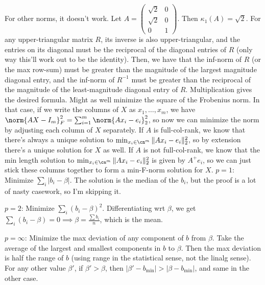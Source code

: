 \documentclass{article}
\newcommand{\openm}{\begin{pmatrix}}
\newcommand{\closem}{\end{pmatrix}}
\begin{document}
For other norms, it doesn't work. Let $A=\openm\sqrt{2}&0\\\sqrt{2}&0\\0&1\closem$. Then $\kappa_1(A)=\sqrt{2}$.
For any upper-triangular matrix $R$, its inverse is also upper-triangular, and the entries on its diagonal must be the reciprocal of the diagonal entries of $R$ (only way this'll work out to be the identity). Then, we have that the inf-norm of $R$ (or the max row-sum) must be greater than the magnitude of the largest magnitude diagonal entry, and the inf-norm of $R^{-1}$ must be greater than the reciprocal of the magnitude of the least-magnitude diagonal entry of $R$. Multiplication gives the desired formula.
Might as well minimize the square of the Frobenius norm. In that case, if we write the columns of $X$ as $x_1,\ldots,x_m$, we have $\norm{AX-I_m}_F^2=\sum_{i=1}^m\norm{Ax_i-e_i}_2^2$, so now we can minimize the norm by adjusting each column of $X$ separately. If $A$ is full-col-rank, we know that there's always a unique solution to $\min_{x_i\in\cn^m}\|Ax_i-e_i\|_2^2$, so by extension there's a unique solution for $X$ as well. If $A$ is not full-col-rank, we know that the min length solution to $\min_{x_i\in\cn^m}\|Ax_i-e_i\|_2^2$ is given by $A^+e_i$, so we can just stick these columns together to form a min-F-norm solution for $X$.
$p=1$: Minimize $\sum_i|b_i-\beta|$. The solution is the median of the $b_i$, but the proof is a lot of nasty casework, so I'm skipping it.

\noindent $p=2$: Minimize $\sum_i(b_i-\beta)^2$. Differentiating wrt $\beta$, we get $\sum_i(b_i-\beta)=0\implies\beta=\frac{\sum b_i}{n}$, which is the mean.

\noindent $p=\infty$: Minimize the max deviation of any component of $b$ from $\beta$. Take the average of the largest and smallest components in $b$ to $\beta$. Then the max deviation is half the range of $b$ (using range in the statistical sense, not the linalg sense). For any other value $\beta'$, if $\beta'>\beta$, then $|\beta'-b_\text{min}|>|\beta-b_\text{min}|$, and same in the other case.
\end{document}

